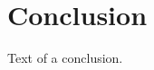 \documentclass[12pt, twoside]{book} %
\begin{document}
\chapter*{Conclusion}          %

Text of a conclusion.




\end{document}
